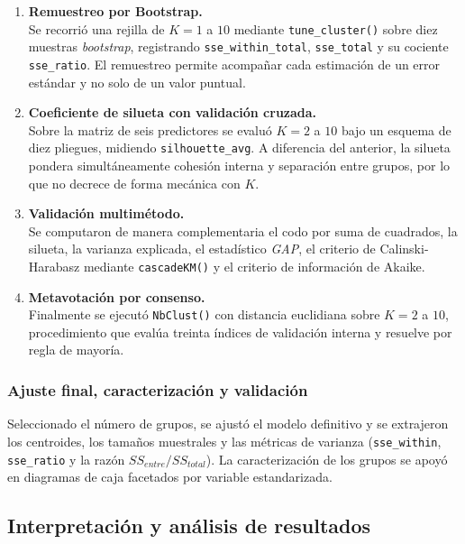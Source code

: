 \documentclass[
  10pt,
  a4paper]{article}
\begin{document}
\begin{enumerate}
\def\labelenumi{\arabic{enumi}.}
\item
  \textbf{Remuestreo por Bootstrap.}\\
  Se recorrió una rejilla de \(K = 1\) a \(10\) mediante \texttt{tune\_cluster()} sobre diez muestras \emph{bootstrap}, registrando \texttt{sse\_within\_total}, \texttt{sse\_total} y su cociente \texttt{sse\_ratio}. El remuestreo permite acompañar cada estimación de un error estándar y no solo de un valor puntual.
\item
  \textbf{Coeficiente de silueta con validación cruzada.}\\
  Sobre la matriz de seis predictores se evaluó \(K = 2\) a \(10\) bajo un esquema de diez pliegues, midiendo \texttt{silhouette\_avg}. A diferencia del anterior, la silueta pondera simultáneamente cohesión interna y separación entre grupos, por lo que no decrece de forma mecánica con \(K\).
\item
  \textbf{Validación multimétodo.}\\
  Se computaron de manera complementaria el codo por suma de cuadrados, la silueta, la varianza explicada, el estadístico \emph{GAP}, el criterio de Calinski-Harabasz mediante \texttt{cascadeKM()} y el criterio de información de Akaike.
\item
  \textbf{Metavotación por consenso.}\\
  Finalmente se ejecutó \texttt{NbClust()} con distancia euclidiana sobre \(K = 2\) a \(10\), procedimiento que evalúa treinta índices de validación interna y resuelve por regla de mayoría.
\end{enumerate}

\subsubsection{Ajuste final, caracterización y validación}\label{ajuste-final-caracterizaciuxf3n-y-validaciuxf3n}

Seleccionado el número de grupos, se ajustó el modelo definitivo y se extrajeron los centroides, los tamaños muestrales y las métricas de varianza (\texttt{sse\_within}, \texttt{sse\_ratio} y la razón \(SS_{entre}/SS_{total}\)). La caracterización de los grupos se apoyó en diagramas de caja facetados por variable estandarizada.

\subsection{Interpretación y análisis de resultados}\label{interpretaciuxf3n-y-anuxe1lisis-de-resultados-1}
\end{document}
